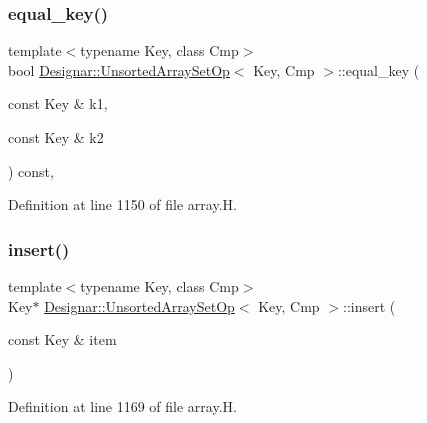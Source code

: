 \subsubsection{\texorpdfstring{equal\+\_\+key()}{equal\_key()}}
{\footnotesize\ttfamily template$<$typename Key, class Cmp$>$ \\
bool \hyperlink{class_designar_1_1_unsorted_array_set_op}{Designar\+::\+Unsorted\+Array\+Set\+Op}$<$ Key, Cmp $>$\+::equal\+\_\+key (\begin{DoxyParamCaption}\item[{const Key \&}]{k1,  }\item[{const Key \&}]{k2 }\end{DoxyParamCaption}) const\hspace{0.3cm}{\ttfamily [inline]}, {\ttfamily [protected]}}



Definition at line 1150 of file array.\+H.

\mbox{\label{class_designar_1_1_unsorted_array_set_op_a7e205053bbcef407bdbde7dae628b2a7}} 
\subsubsection{\texorpdfstring{insert()}{insert()}\hspace{0.1cm}{\footnotesize\ttfamily [1/2]}}
{\footnotesize\ttfamily template$<$typename Key, class Cmp$>$ \\
Key$\ast$ \hyperlink{class_designar_1_1_unsorted_array_set_op}{Designar\+::\+Unsorted\+Array\+Set\+Op}$<$ Key, Cmp $>$\+::insert (\begin{DoxyParamCaption}\item[{const Key \&}]{item }\end{DoxyParamCaption})\hspace{0.3cm}{\ttfamily [inline]}}



Definition at line 1169 of file array.\+H.

\mbox{\label{class_designar_1_1_unsorted_array_set_op_aaab3531e6bd3e3044560f3645ce2c529}} 
